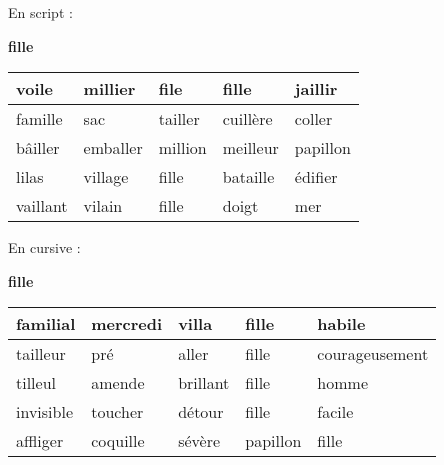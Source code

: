 \documentclass[a4paper, 11pt,oneside, fleqn]{article}
\begin{document}
\begin{onehalfspace}
\large\noindent En script :
\begin{center} {\huge \textbf{fille}}
\vspace{0.25cm}\\
\begin{tabulary}{17cm}{|h|h|h|h|h|}
\hline
voile & millier & file & fille & jaillir \\
\hline
famille & sac & tailler & cuillère & coller \\
\hline
bâiller & emballer & million & meilleur & papillon \\
\hline
lilas & village & fille & bataille & édifier \\
\hline
vaillant & vilain & fille & doigt & mer \\
\hline
\end{tabulary}
\end{center}
\vspace{0.5cm}

\large\noindent En cursive :
\begin{center}
{\huge \textbf {{\cursive fille}}}
\vspace{0.25cm}\\
\begin{tabulary}{17cm}{|i|i|i|i|i|}
\hline
familial & mercredi & villa & fille & habile \\
\hline
tailleur & pré & aller & fille & courageusement \\
\hline
tilleul & amende & brillant & fille & homme \\
\hline
invisible & toucher & détour & fille & facile \\
\hline
affliger & coquille & sévère & papillon & fille \\
\hline
\end{tabulary}
\end{center}

\end{onehalfspace}
\end{document}
